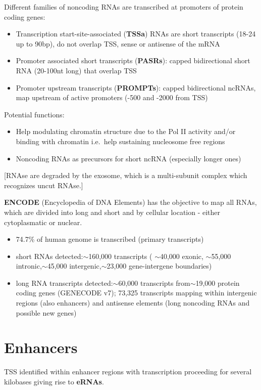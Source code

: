 Different families of noncoding RNAs are transcribed at promoters of protein coding genes:

\begin{itemize}
\tightlist
\item
  Transcription start-site-associated (\textbf{TSSa}) RNAs are short transcripts (18-24 up to 90bp), do not overlap TSS, sense or antisense of the mRNA
\item
  Promoter associated short transcripts (\textbf{PASRs}): capped bidirectional short RNA (20-100nt long) that overlap TSS
\item
  Promoter upstream transcripts (\textbf{PROMPTs}): capped bidirectional ncRNAs, map upstream of active promoters (-500 and -2000 from TSS)
\end{itemize}

Potential functions:
\begin{itemize}
\item Help modulating chromatin structure due to the Pol II activity and/or binding with chromatin i.e.~help sustaining nucleosome free regions
\item  Noncoding RNAs as precursors for short ncRNA (especially longer ones)
\end{itemize}

{[}RNAse are degraded by the exosome, which is a multi-subunit complex which recognizes uncut RNAse.{]}

\textbf{ENCODE} (Encyclopedia of DNA Elements) has the objective to map all RNAs, which are divided into long and short and by cellular location - either cytoplasmatic or nuclear.

\begin{itemize}
\tightlist
\item
  74.7\% of human genome is transcribed (primary transcripts)
\item
  short RNAs detected:$\sim$160,000 transcripts ( $\sim$40,000 exonic, $\sim$55,000 intronic,$\sim$45,000 intergenic,$\sim$23,000 gene-intergene boundaries)
\item
  long RNA transcripts detected:$\sim$60,000 transcripts from$\sim$19,000 protein coding genes (GENECODE v7); 73,325 transcripts mapping within intergenic regions (also enhancers) and antisense elements (long noncoding RNAs and possible new genes)
\end{itemize}

\section{Enhancers}
TSS identified within enhancer regions with transcription proceeding for several kilobases giving rise to \textbf{eRNAs}.

